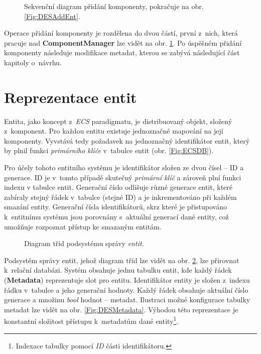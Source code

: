 \begin{figure}[H]
	\centering
	\caption{Sekvenční diagram přidání komponenty, pokračuje na obr. \ref{Fig:DESAddEnt}.}
	\label{Fig:DESAddComp}
\end{figure}

Operace přidání komponenty je rozdělena do dvou částí, první z~nich, která pracuje nad \textbf{ComponentManager} lze vidět na obr. \ref{Fig:DESAddComp}. Po úspěšném přidání komponenty následuje modifikace metadat, kterou se zabývá následující část kapitoly o~návrhu.

\section{Reprezentace entit}

Entita, jako koncept z~\emph{ECS} paradigmatu, je distribuovaný objekt, složený z~komponent. Pro každou entitu existuje jednoznačné mapování na její komponenty. Vyvstává tedy požadavek na jednoznačný identifikátor entit, který by plnil funkci \emph{primárního klíče} v~tabulce entit (obr. \ref{Fig:ECSDB}).

Pro účely tohoto entitního systému je identifikátor složen ze dvou čísel -- ID a generace. ID je v~tomto případě skutečný \emph{primární klíč} a zároveň plní funkci indexu v tabulce entit. Generační číslo odlišuje různé generace entit, které zabíraly stejný řádek v~tabulce (stejné ID) a je inkrementováno při každém smazání entity. Generační čísla identifikátorů, skrz které je přistupováno k~entitnímu systému jsou porovnány s~aktuální generací dané entity, což umožňuje rozpoznat přístup ke smazaným entitám.

\begin{figure}[H]
	\centering
	\caption{Diagram tříd podsystému správy \emph{entit}.}
	\label{Fig:DESEntityDiagram}
\end{figure}

Podsystém správy entit, jehož diagram tříd lze vidět na obr. \ref{Fig:DESEntityDiagram}, lze přirovnat k~relační databázi. Systém obsahuje jednu tabulku entit, kde každý řádek (\textbf{Metadata}) reprezentuje slot pro entitu. Identifikátor entity je složen z~indexu řádku v~tabulce a jeho generační hodnoty. Každý řádek obsahuje aktuální číslo generace a množinu \emph{bool} hodnot -- metadat. Ilustraci možné konfigurace tabulky metadat lze vidět na obr. \ref{Fig:DESMetadata}. Výhodou této reprezentace je konstantní složitost přístupu k~metadatům dané entity\footnote{Indexace tabulky pomocí \emph{ID} části identifikátoru.}. 

